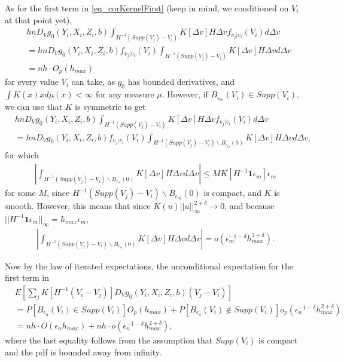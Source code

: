 \documentclass{article}
\theoremstyle{definition}
\theoremstyle{remark}
\begin{document}
As for the first term in \eqref{eq_corKernelFirst} (keep in mind, we conditioned on $V_i$ at that point yet),
\begin{align}
&hn D_V g_0(Y_i, X_i, Z_i, b)\int_{H^{-1} (Supp(V_j)-V_i)} K[\Delta v] H\Delta v f_{v_j|v_i}(V_i)d\Delta v \\
&=hn D_V g_0(Y_i, X_i, Z_i, b)f_{v_j|v_i}(V_i)\int_{H^{-1} (Supp(V_j)-V_i)} K[\Delta v] H\Delta v d\Delta v \nonumber \\
&=nh \cdot O_p(h_{max}) \nonumber
\end{align}
for every value $V_i$ can take, as $g_0$ has bounded derivatives, and $\int K(x)x d\mu(x)<\infty$ for any measure $\mu$. However, if $B_{\epsilon_m}(V_i) \in Supp(V_i)$, we can use that $K$ is symmetric to get
\begin{align}
&hn D_V g_0(Y_i, X_i, Z_i, b)\int_{H^{-1} (Supp(V_j)-V_i)} K[\Delta v] H\Delta v f_{v_j|v_i}(V_i)d\Delta v \\
&= hn D_V g_0(Y_i, X_i, Z_i, b) f_{v_j|v_i}(V_i) \int_{H^{-1} (Supp(V_j)-V_i)\backslash B_{\epsilon_m}(0)} K[\Delta v] H\Delta v d\Delta v, \nonumber
\end{align}
for which
\begin{align}
\left|\int_{H^{-1} (Supp(V_j)-V_i)\backslash B_{\epsilon_m}(0)} K[\Delta v] H\Delta v d\Delta v\right|\leq M K[H^{-1}\mathbf{1} \epsilon_m] \epsilon_m 
\end{align}
for some $M$, since $H^{-1} (Supp(V_j)-V_i)\backslash B_{\epsilon_m}(0)$ is compact, and $K$ is smooth. However, this means that since $K(u) ||u||_\infty^{2+\delta} \rightarrow 0$, and because $||H^{-1}\mathbf{1}\epsilon_m||_\infty = h_{max}\epsilon_m$,
\begin{align}
\left|\int_{H^{-1} (Supp(V_j)-V_i)\backslash B_{\epsilon_m}(0)} K[\Delta v] H\Delta v d\Delta v\right| = o(\epsilon_m^{-1-\delta}h_{max}^{2+\delta}).
\end{align}

Now by the law of iterated expectations, the unconditional expectation for the first term in 
\begin{align}
&E\left[\sum_j K[H^{-1}(V_i-V_j)]D_V g_0(Y_i, X_i, Z_i, b)(V_j-V_i)\right] \\
&= P[B_{\epsilon_n}(V_i) \in Supp(V_i)] O_p(h_{max})  + P[B_{\epsilon_n}(V_i) \notin Supp(V_i)]o_p(\epsilon_n^{-1-\delta}h_{max}^{2+\delta}) \nonumber \\
&= nh \cdot O(\epsilon_n h_{max}) + nh \cdot o(\epsilon_n^{-1-\delta}h_{max}^{2+\delta}), \nonumber
\end{align}
where the last equality follows from the assumption that $Supp(V_i)$ is compact and the pdf is bounded away from infinity.
\end{document}
